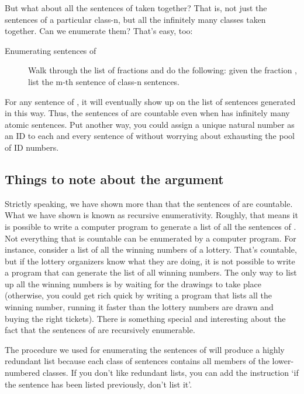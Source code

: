 But what about all the sentences of \lL{} taken together? That is, not just the 
sentences of a particular class-n, but all the infinitely many classes taken 
together.  Can we enumerate them? That's easy, too:

\begin{description}
 \item[Enumerating sentences of \lL{}] Walk through the list of fractions and do 
  the following: given the fraction , list the m-th sentence of 
  class-n sentences.
\end{description}

For any sentence of \lL{}, it will eventually show up on the list of sentences 
generated in this way. Thus, the sentences of \lL{} are countable even when 
\lL{} has infinitely many atomic sentences. Put another way, you could assign a  
unique natural number as an ID to each and every sentence of \lL{} without 
worrying about exhausting the pool of ID numbers.


\subsection{Things to note about the argument}


Strictly speaking, we have shown more than that the sentences of \lL{} are 
countable. What we have shown is known as recursive enumerativity.  Roughly, 
that means it is possible to write a computer program to generate a list of all 
the sentences of \lL{}.  Not everything that is countable can be enumerated by a 
computer program. For instance, consider a list of all the winning numbers of a 
lottery.  That's countable, but if the lottery organizers know what they are 
doing, it is not possible to write a program that can generate the list of all 
winning numbers. The only way to list up all the winning numbers is by waiting 
for the drawings to take place (otherwise, you could get rich quick by writing a 
program that lists all the winning number, running it faster than the lottery 
numbers are drawn and buying the right tickets).  There is something special and 
interesting about the fact that the sentences of \lL{} are recursively 
enumerable.

The procedure we used for enumerating the sentences of \lL{}  will produce a 
highly redundant list because each class of sentences contains all members of 
the lower-numbered classes. If you don't like redundant lists, you can add the 
instruction `if the sentence has been listed previously, don't list it'.

